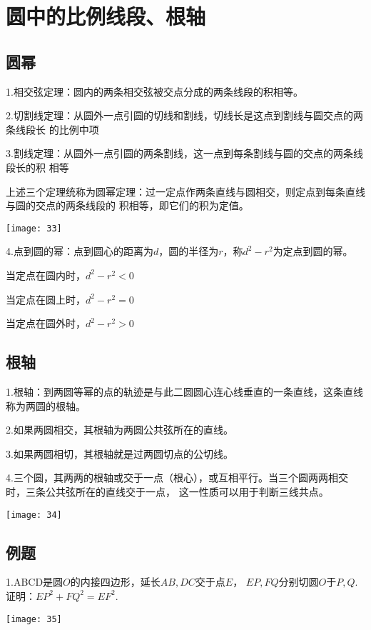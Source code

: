 \section{圆中的比例线段、根轴}
\subsection{圆幂}
1.相交弦定理：圆内的两条相交弦被交点分成的两条线段的积相等。

2.切割线定理：从圆外一点引圆的切线和割线，切线长是这点到割线与圆交点的两条线段长
的比例中项

3.割线定理：从圆外一点引圆的两条割线，这一点到每条割线与圆的交点的两条线段长的积
相等

上述三个定理统称为圆幂定理：过一定点作两条直线与圆相交，则定点到每条直线与圆的交点的两条线段的
积相等，即它们的积为定值。
\begin{center}
    \texttt{[image: 33]}
\end{center}

4.点到圆的幂：点到圆心的距离为$d$，圆的半径为$r$，称$d^2-r^2$为定点到圆的幂。

当定点在圆内时，$d^2-r^2<0$

当定点在圆上时，$d^2-r^2=0$

当定点在圆外时，$d^2-r^2>0$

\subsection{根轴}
1.根轴：到两圆等幂的点的轨迹是与此二圆圆心连心线垂直的一条直线，这条直线称为两圆的根轴。

2.如果两圆相交，其根轴为两圆公共弦所在的直线。

3.如果两圆相切，其根轴就是过两圆切点的公切线。

4.三个圆，其两两的根轴或交于一点（根心），或互相平行。当三个圆两两相交时，三条公共弦所在的直线交于一点，
这一性质可以用于判断三线共点。
\begin{center}
    \texttt{[image: 34]}
\end{center}

\subsection{例题}
1.ABCD是圆$O$的内接四边形，延长$AB,DC$交于点$E$，
$EP,FQ$分别切圆$O$于$P,Q$.证明：$EP^2+FQ^2=EF^2$.

\begin{center}
    \texttt{[image: 35]}
\end{center}

